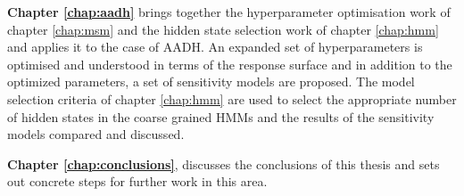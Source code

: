 \textbf{Chapter \ref{chap:aadh}} brings together the hyperparameter optimisation work of chapter  \ref{chap:msm} and the hidden state selection work of chapter \ref{chap:hmm} and applies it to the case of AADH. An expanded set of hyperparameters is optimised and understood in terms of the response surface and in addition to the optimized parameters, a set of sensitivity models are proposed. The model selection criteria of chapter \ref{chap:hmm} are used to select the appropriate number of hidden states in the coarse grained HMMs and the results of the sensitivity models compared and discussed. 

\textbf{Chapter \ref{chap:conclusions}}, discusses the conclusions of this thesis and sets out concrete steps for further work in this area. 























